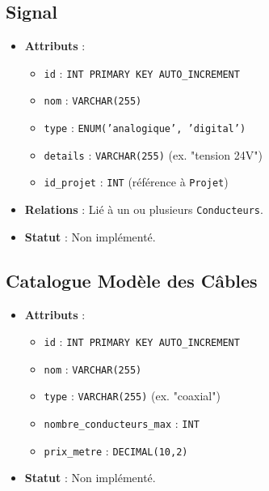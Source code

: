 \documentclass[a4paper,12pt]{article}
\begin{document}
\subsection{Signal}
\begin{itemize}
    \item \textbf{Attributs} :
    \begin{itemize}
        \item \texttt{id} : \texttt{INT PRIMARY KEY AUTO\_INCREMENT}
        \item \texttt{nom} : \texttt{VARCHAR(255)}
        \item \texttt{type} : \texttt{ENUM('analogique', 'digital')}
        \item \texttt{details} : \texttt{VARCHAR(255)} (ex. "tension 24V")
        \item \texttt{id\_projet} : \texttt{INT} (référence à \texttt{Projet})
    \end{itemize}
    \item \textbf{Relations} : Lié à un ou plusieurs \texttt{Conducteurs}.
    \item \textbf{Statut} : Non implémenté.
\end{itemize}

\subsection{Catalogue Modèle des Câbles}
\begin{itemize}
    \item \textbf{Attributs} :
    \begin{itemize}
        \item \texttt{id} : \texttt{INT PRIMARY KEY AUTO\_INCREMENT}
        \item \texttt{nom} : \texttt{VARCHAR(255)}
        \item \texttt{type} : \texttt{VARCHAR(255)} (ex. "coaxial")
        \item \texttt{nombre\_conducteurs\_max} : \texttt{INT}
        \item \texttt{prix\_metre} : \texttt{DECIMAL(10,2)}
    \end{itemize}
    \item \textbf{Statut} : Non implémenté.
\end{itemize}
\end{document}
